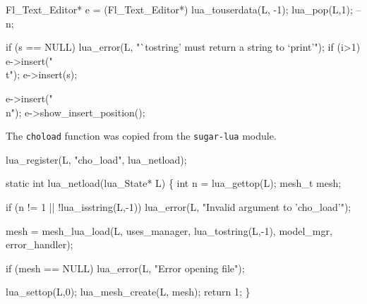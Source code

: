\nwenddocs{}\endmoddef
Fl_Text_Editor* e = (Fl_Text_Editor*) lua_touserdata(L, -1);
lua_pop(L,1);
--n;
\nwendcode{}\nwdocspar

\nwenddocs{}\endmoddef
if (s == NULL)
    lua_error(L, "`tostring' must return a string to `print'");
if (i>1) e->insert("\\t");
e->insert(s);
\nwendcode{}\nwdocspar

\nwenddocs{}\endmoddef
e->insert("\\n");
e->show_insert_position();
\nwendcode{}\nwdocspar

The {\tt{}cho{}load} function was copied from the {\tt{}sugar-lua} module.

\nwenddocs{}\plusendmoddef
lua_register(L, "cho_load", lua_netload);

\nwendcode{}\nwdocspar

\nwenddocs{}\plusendmoddef
static int lua_netload(lua_State* L)
\{
    int n = lua_gettop(L);
    mesh_t mesh;

    if (n != 1 || !lua_isstring(L,-1))
        lua_error(L, "Invalid argument to 'cho_load'");

    mesh = mesh_lua_load(L, uses_manager, lua_tostring(L,-1),
                         model_mgr, error_handler);

    if (mesh == NULL)
        lua_error(L, "Error opening file");

    lua_settop(L,0);
    lua_mesh_create(L, mesh);
    return 1;
\}

